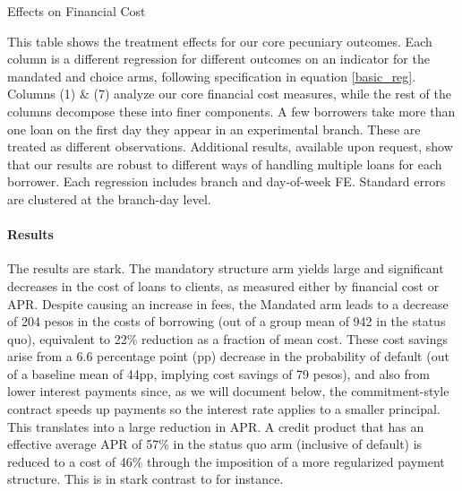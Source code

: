 \documentclass[12pt, a4paper, colorinlistoftodos]{article}
\begin{document}
\begin{table}
\caption{Effects on Financial Cost}
\label{main_impact_table}
\begin{center}
\resizebox{1.0\textwidth}{!}{
\footnotesize{}
}
\end{center}
\scriptsize{This table shows the treatment effects for our core pecuniary outcomes. Each column is a different regression for different outcomes on an indicator for the mandated and choice arms, following specification in equation \ref{basic_reg}. Columns (1) \& (7) analyze our core financial cost measures, while the rest of the columns decompose these into finer components.
A few borrowers take more than one loan on the first day they appear in an experimental branch. These are treated as different observations. Additional results, available upon request, show that our results are robust to different ways of handling multiple loans for each borrower. Each regression includes branch and day-of-week FE. Standard errors are clustered at the branch-day level. }

\end{table}



\paragraph*{Results} The results are stark. The mandatory structure arm yields large and significant decreases in the cost of loans to clients, as measured either by financial cost or APR. Despite causing an increase in fees, the Mandated arm leads to a decrease of 204 pesos in the costs of borrowing (out of a group mean of 942 in the status quo), equivalent to 22\% reduction as a fraction of mean cost. These cost savings arise from a 6.6 percentage point (pp) decrease in the probability of default (out of a baseline mean of 44pp,  implying cost savings of 79 pesos), and also from lower interest payments since, as we will document below, the commitment-style contract speeds up payments so the interest rate applies to a smaller principal. This translates into a large reduction in APR. A credit product that has an effective average APR of 57\% in the status quo arm (inclusive of default) is reduced to a cost of 46\% through the imposition of a more regularized payment structure. This is in stark contrast to \cite{Pande} for instance.  
\end{document}
